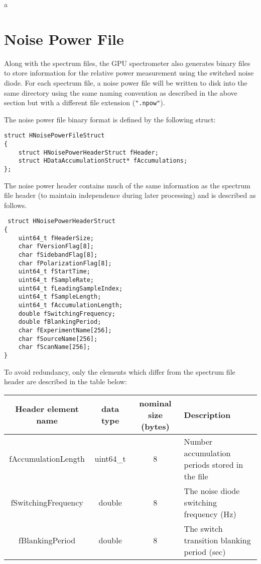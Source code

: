 a\documentclass[a4paper,14pt]{article}
\begin{document}
\section{Noise Power File}

Along with the spectrum files, the GPU spectrometer also generates binary files to store information for the relative power measurement using the switched noise diode. 
For each spectrum file, a noise power file will be written to disk into the same directory using the same naming convention as described in the above section but with a
different file extension (\verb|".npow"|).

The noise power file binary format is defined by the following struct:
\begin{lstlisting}
struct HNoisePowerFileStruct
{
    struct HNoisePowerHeaderStruct fHeader;
    struct HDataAccumulationStruct* fAccumulations;
};
\end{lstlisting}
The noise power header contains much of the same information as the spectrum file header (to maintain independence during later processing)
and is described as follows.


\begin{lstlisting}
 struct HNoisePowerHeaderStruct
{
    uint64_t fHeaderSize; 
    char fVersionFlag[8];
    char fSidebandFlag[8];
    char fPolarizationFlag[8];
    uint64_t fStartTime;
    uint64_t fSampleRate;
    uint64_t fLeadingSampleIndex;
    uint64_t fSampleLength;
    uint64_t fAccumulationLength;
    double fSwitchingFrequency;
    double fBlankingPeriod;
    char fExperimentName[256];
    char fSourceName[256];
    char fScanName[256];
}
\end{lstlisting}

To avoid redundancy, only the elements which differ from the spectrum file header are described in the table below:

\begin{center}
\begin{tabularx}{\linewidth} {| c | c | c | L |}
\hline
 Header element name & data type & nominal size (bytes) & Description \\  \hline
 fAccumulationLength  & uint64\_t & 8 & Number accumulation periods stored in the file \\ \hline
 fSwitchingFrequency  & double & 8 & The noise diode switching frequency (Hz) \\ \hline
 fBlankingPeriod  & double & 8 & The switch transition blanking period (sec) \\ \hline
\end{tabularx}
\end{center}
\end{document}
